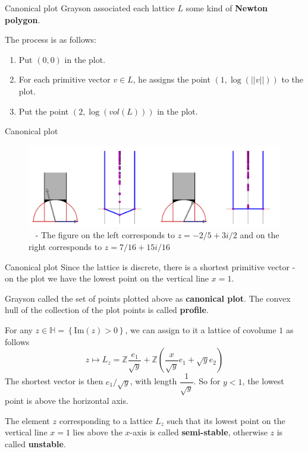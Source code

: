 \documentclass[pdf]{beamer}
\newcommand\Mycite[1]{%
  \citeauthor{#1}~}
\begin{document}
\begin{frame}{Canonical plot}
    Grayson associated each lattice $L$  some kind of \textbf{Newton polygon}. \pause

    The process is as follows:
    \begin{enumerate}
        \item Put $(0,0)$ in the plot.
        \item For each primitive vector $v \in L$, he assigns the point $(1,\log(||v||))$ to the plot.
        \item Put the point $(2,\log(vol(L)))$ in the plot.
    \end{enumerate}
\end{frame}
\begin{frame}{Canonical plot}
    \begin{figure}[h]
        \includegraphics[width = \textwidth]{Canonical plot.png}
        \caption{\Mycite{casselman2004stability} - The figure on the left corresponds to $z = -2/5 +3i/2$ and on the right corresponds to $z = 7/16+15i/16$ }
    \end{figure}
\end{frame}
\begin{frame}{Canonical plot}
    Since the lattice is discrete, there is a shortest primitive vector - on the plot we have the lowest point on the vertical line $x=1$.\pause\vspace{3em}

    Grayson called the set of points plotted above as \textbf{canonical plot}. The convex hull of the collection
    of the plot points is called \textbf{profile}.
\end{frame}
\begin{frame}
    For any $z \in \mathbb{H} = \left\lbrace \text{Im}(z)>0 \right\rbrace$, we can assign to it a lattice of covolume $1$ as follows
    \[z \mapsto L_z = \mathbb{Z}\dfrac{e_1}{\sqrt{y}} + \mathbb{Z}\left(\dfrac{x}{\sqrt{y}}e_1+\sqrt{y}e_2 \right)\]
    The shortest vector is then $ e_1/\sqrt{y}$, with length $\dfrac{1}{\sqrt{y}}$. So for $y<1$, the lowest
    point is above the horizontal axis.
    \pause \vspace{2em}

    The element $z$ corresponding to a lattice $L_z$ such that its lowest point on the
    vertical line $x=1$ lies above the $x$-axis is called \textbf{semi-stable}, otherwise $z$ is called \textbf{unstable}.
\end{frame}
\end{document}
